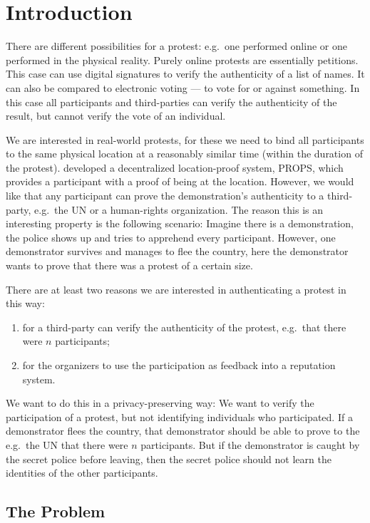 \section{Introduction}
\label{Introduction}

There are different possibilities for a protest: e.g.\ one performed online or 
one performed in the physical reality.
Purely online protests are essentially petitions.
This case can use digital signatures to verify the authenticity of a list of 
names.
It can also be compared to electronic voting --- to vote for or against 
something.
In this case all participants and third-parties can verify the authenticity of 
the result, but cannot verify the vote of an individual.

We are interested in real-world protests, for these we need to bind all 
participants to the same physical location at a reasonably similar time (within 
the duration of the protest).
\citeauthor{PROPS} developed a decentralized location-proof system, \ac{PROPS}, 
which provides a participant with a proof of being at the location.
However, we would like that any participant can prove the demonstration's 
authenticity to a third-party, e.g.\ the UN or a human-rights 
organization.
The reason this is an interesting property is the following scenario:
Imagine there is a demonstration, the police shows up and tries to apprehend 
every participant.
However, one demonstrator survives and manages to flee the country, here the 
demonstrator wants to prove that there was a protest of a certain size.

There are at least two reasons we are interested in authenticating a protest in 
this way:
\begin{enumerate}
  \item for a third-party can verify the authenticity of the protest, e.g.\ 
    that there were \(n\) participants;
  \item for the organizers to use the participation as feedback into 
    a reputation system.
\end{enumerate}
We want to do this in a privacy-preserving way:
We want to verify the participation of a protest, but not identifying 
individuals who participated.
If a demonstrator flees the country, that demonstrator should be able to prove 
to the e.g.\ the UN that there were \(n\) participants.
But if the demonstrator is caught by the secret police before leaving, then the 
secret police should not learn the identities of the other participants.

\subsection{The Problem}


